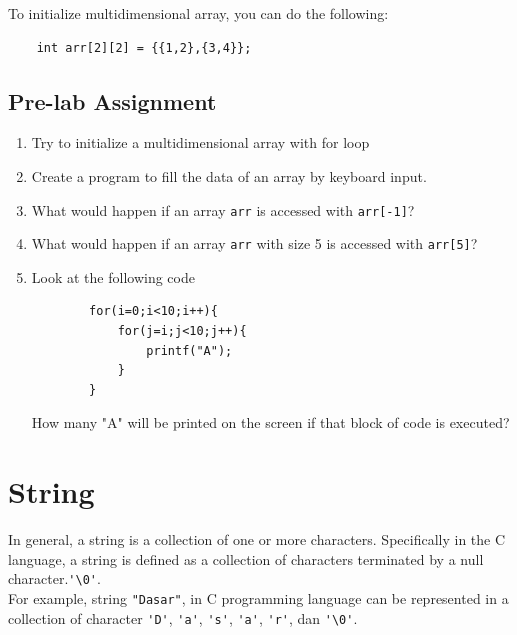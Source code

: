 To initialize multidimensional array, you can do the following:
\begin{verbatim}
    int arr[2][2] = {{1,2},{3,4}};
\end{verbatim}

\subsection{Pre-lab Assignment}
\begin{enumerate}
	\item Try to initialize a multidimensional array with for loop
	\item Create a program to fill the data of an array by keyboard input.
	\item What would happen if an array \verb|arr| is accessed with \verb|arr[-1]|?
	\item What would happen if an array \verb|arr| with size 5 is accessed with \verb|arr[5]|?
	\item Look at the following code
	      \begin{verbatim}
        for(i=0;i<10;i++){
            for(j=i;j<10;j++){
                printf("A");
            }
        }
    \end{verbatim}
	      How many "A" will be printed on the screen if that block of code is executed?
\end{enumerate}

\section{String}

In general, a string is a collection of one or more characters. Specifically in the C language, a string is defined as a collection of characters terminated by a null character.\verb|'\0'|.
\\
For example, string \verb|"Dasar"|, in C programming language can be represented in a collection of character \verb|'D'|, \verb|'a'|, \verb|'s'|, \verb|'a'|, \verb|'r'|, dan \verb|'\0'|.
